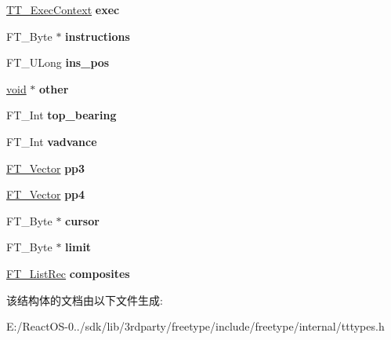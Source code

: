 \begin{DoxyCompactItemize}
\mbox{\label{struct_t_t___loader_rec___a22cae1f510e891a525092d33b373cc01}} 
\hyperlink{struct_t_t___exec_context_rec__}{T\+T\+\_\+\+Exec\+Context} {\bfseries exec}
\item 
\mbox{\label{struct_t_t___loader_rec___aaf1018107d5166a684604fde765b625a}} 
F\+T\+\_\+\+Byte $\ast$ {\bfseries instructions}
\item 
\mbox{\label{struct_t_t___loader_rec___a56c391d36a6391e8395cd09bc972b8b0}} 
F\+T\+\_\+\+U\+Long {\bfseries ins\+\_\+pos}
\item 
\mbox{\label{struct_t_t___loader_rec___a52009bf0f7ac51833b9fcba1b3bf0ffd}} 
\hyperlink{interfacevoid}{void} $\ast$ {\bfseries other}
\item 
\mbox{\label{struct_t_t___loader_rec___a00c9197ba5abd4e677f116423793a9f4}} 
F\+T\+\_\+\+Int {\bfseries top\+\_\+bearing}
\item 
\mbox{\label{struct_t_t___loader_rec___aec9d10cfbe0ced3fff990bb9e936e95d}} 
F\+T\+\_\+\+Int {\bfseries vadvance}
\item 
\mbox{\label{struct_t_t___loader_rec___a262052584bfb1ec7e6e801f71169093b}} 
\hyperlink{struct_f_t___vector__}{F\+T\+\_\+\+Vector} {\bfseries pp3}
\item 
\mbox{\label{struct_t_t___loader_rec___a0608203207c3fc735046b8baef4b9201}} 
\hyperlink{struct_f_t___vector__}{F\+T\+\_\+\+Vector} {\bfseries pp4}
\item 
\mbox{\label{struct_t_t___loader_rec___a6769a96f37ca22801f6199937cbe9ca7}} 
F\+T\+\_\+\+Byte $\ast$ {\bfseries cursor}
\item 
\mbox{\label{struct_t_t___loader_rec___a1b07761e8ea436c38b4c42117a00a0ff}} 
F\+T\+\_\+\+Byte $\ast$ {\bfseries limit}
\item 
\mbox{\label{struct_t_t___loader_rec___a77d3f1d03acc92d588dc4179ceab21dd}} 
\hyperlink{struct_f_t___list_rec__}{F\+T\+\_\+\+List\+Rec} {\bfseries composites}
\end{DoxyCompactItemize}


该结构体的文档由以下文件生成\+:\begin{DoxyCompactItemize}
\item 
E\+:/\+React\+O\+S-\/0../sdk/lib/3rdparty/freetype/include/freetype/internal/tttypes.\+h\end{DoxyCompactItemize}
